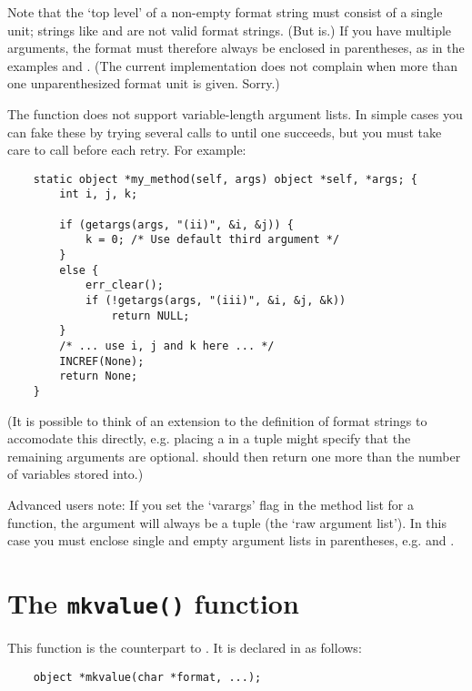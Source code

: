Note that the `top level' of a non-empty format string must consist of
a single unit; strings like  and  are not valid
format strings.  (But  is.)  If you have multiple arguments,
the format must therefore always be enclosed in parentheses, as in the
examples  and .  (The current
implementation does not complain when more than one unparenthesized
format unit is given.  Sorry.)

The  function does not support variable-length
argument lists.  In simple cases you can fake these by trying several
calls to
 until one succeeds, but you must take care to call
 before each retry.  For example:

\begin{verbatim}
    static object *my_method(self, args) object *self, *args; {
        int i, j, k;

        if (getargs(args, "(ii)", &i, &j)) {
            k = 0; /* Use default third argument */
        }
        else {
            err_clear();
            if (!getargs(args, "(iii)", &i, &j, &k))
                return NULL;
        }
        /* ... use i, j and k here ... */
        INCREF(None);
        return None;
    }
\end{verbatim}

(It is possible to think of an extension to the definition of format
strings to accomodate this directly, e.g. placing a \samp{|} in a
tuple might specify that the remaining arguments are optional.
 should then return one more than the number of
variables stored into.)

Advanced users note: If you set the `varargs' flag in the method list
for a function, the argument will always be a tuple (the `raw argument
list').  In this case you must enclose single and empty argument lists
in parentheses, e.g.  and \samp{()}.


\section{The {\tt mkvalue()} function}

This function is the counterpart to .  It is declared
in  as follows:

\begin{verbatim}
    object *mkvalue(char *format, ...);
\end{verbatim}


